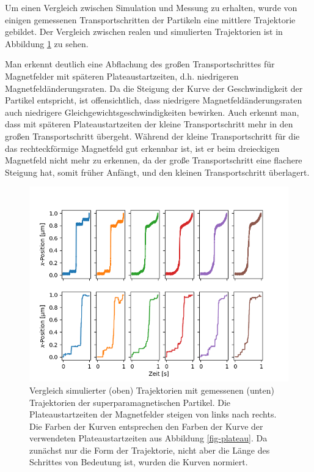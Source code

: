 \documentclass[page,pdftex,12pt,a4paper,twoside,openright]{scrbook}
\begin{document}
Um einen Vergleich zwischen Simulation und Messung zu erhalten, wurde von einigen gemessenen Transportschritten der Partikeln eine mittlere Trajektorie gebildet. Der Vergleich zwischen realen und simulierten Trajektorien ist in Abbildung \ref{fig-traj} zu sehen.

Man erkennt deutlich eine Abflachung des großen Transportschrittes für Magnetfelder mit späteren Plateaustartzeiten, d.h. niedrigeren Magnetfeldänderungsraten. Da die Steigung der Kurve der Geschwindigkeit der Partikel entspricht, ist offensichtlich, dass niedrigere Magnetfeldänderungsraten auch niedrigere Gleichgewichtsgeschwindigkeiten bewirken. Auch erkennt man, dass mit späteren Plateaustartzeiten der kleine Transportschritt mehr in den großen Transportschritt übergeht. Während der kleine Transportschritt für die das rechteckförmige Magnetfeld gut erkennbar ist, ist er beim dreieckigen Magnetfeld nicht mehr zu erkennen, da der große Transportschritt eine flachere Steigung hat, somit früher Anfängt, und den kleinen Transportschritt überlagert.

\begin{figure}[htbp]
\centering
\includegraphics[width=\textwidth]{./img/sim.png}
\caption{\label{fig-traj}
Vergleich simulierter (oben) Trajektorien mit gemessenen (unten) Trajektorien der superparamagnetischen Partikel. Die Plateaustartzeiten der Magnetfelder steigen von links nach rechts. Die Farben der Kurven entsprechen den Farben der Kurve der verwendeten Plateaustartzeiten aus Abbildung \ref{fig-plateau}. Da zunächst nur die Form der Trajektorie, nicht aber die Länge des Schrittes von Bedeutung ist, wurden die Kurven normiert.}
\end{figure}
\end{document}
